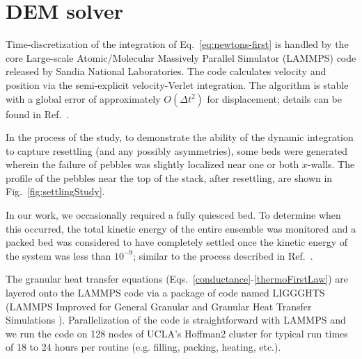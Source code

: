 \section{DEM solver}\label{sec:dem-solver}

Time-discretization of the integration of Eq.~\ref{eq:newtons-first} is handled by the core Large-scale Atomic/Molecular Massively Parallel Simulator (LAMMPS) code released by Sandia National Laboratories\cite{Plimpton1995, Parks2008}. The code calculates velocity and position via the semi-explicit velocity-Verlet integration. The algorithm is stable with a global error of approximately $O(\Delta t^2)$ for displacement; details can be found in Ref.~\cite{Grubmuller1991}.

In the process of the study, to demonstrate the ability of the dynamic integration to capture resettling (and any possibly asymmetries), some beds were generated wherein the failure of pebbles was slightly localized near one or both $x$-walls. The profile of the pebbles near the top of the stack, after resettling, are shown in Fig.~\ref{fig:settlingStudy}. 

In our work, we occasionally required a fully quiesced bed. To determine when this occurred, the total kinetic energy of the entire ensemble was monitored and a packed bed was considered to have completely settled once the kinetic energy of the system was less than $10^{-9}$; similar to the process described in Ref.~\cite{Silbert2002a}. 


The granular heat transfer equations (Eqs.~\ref{conductance}-\ref{thermoFirstLaw}) are layered onto the LAMMPS code via a package of code named LIGGGHTS (LAMMPS Improved for General Granular and Granular Heat Transfer Simulations \cite{kloss2012a}). Parallelization of the code is straightforward with LAMMPS and we run the code on 128 nodes of UCLA's Hoffman2 cluster for typical run times of 18 to 24 hours per routine ({e.g.} filling, packing, heating, etc.).